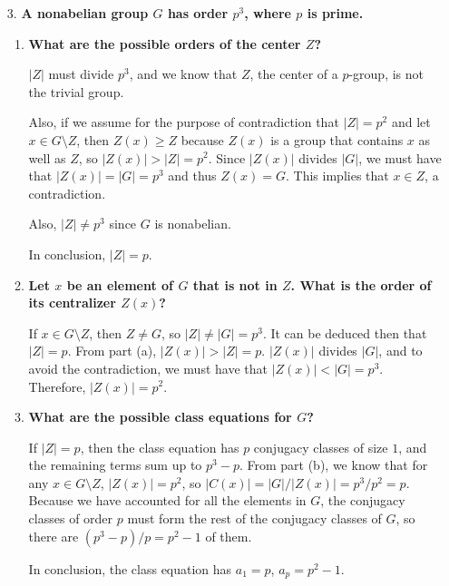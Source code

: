 \documentclass[a4paper,12pt]{article}
\begin{document}
\begin{enumerate}
    \item[3.]
        \boldmath
        \textbf{A nonabelian group $G$ has order $p^3$, where $p$ is prime.} \par
        \unboldmath
        \begin{enumerate}
            \item
                \boldmath
                \textbf{What are the possible orders of the center $Z$?} \par
                \unboldmath
                $|Z|$ must divide $p^3$, and we know that $Z$, the center of a $p$-group, is not the trivial group. \par
                Also, if we assume for the purpose of contradiction that $|Z| = p^2$ and let $x \in G \setminus Z$, then $Z(x) \ge Z$ because $Z(x)$ is a group that contains $x$ as well as $Z$, so $|Z(x)| > |Z| = p^2$. Since $|Z(x)|$ divides $|G|$, we must have that $|Z(x)| = |G| = p^3$ and thus $Z(x) = G$. This implies that $x \in Z$, a contradiction. \par
                Also, $|Z| \neq p^3$ since $G$ is nonabelian. \par
                In conclusion, $|Z| = p$.

            \item
                \boldmath
                \textbf{Let $x$ be an element of $G$ that is not in $Z$. What is the order of its centralizer $Z(x)$?} \par
                \unboldmath
                If $x \in G \setminus Z$, then $Z \neq G$, so $|Z| \neq |G| = p^3$. It can be deduced then that $|Z| = p$. From part (a), $|Z(x)| > |Z| = p$. $|Z(x)|$ divides $|G|$, and to avoid the contradiction, we must have that $|Z(x)| < |G| = p^3$. Therefore, $|Z(x)| = p^2$.

            \item
                \boldmath
                \textbf{What are the possible class equations for $G$?} \par
                \unboldmath
                If $|Z| = p$, then the class equation has $p$ conjugacy classes of size $1$, and the remaining terms sum up to $p^3 - p$. From part (b), we know that for any $x \in G \setminus Z$, $|Z(x)| = p^2$, so $|C(x)| = |G|/|Z(x)| = p^3/p^2 = p$. Because we have accounted for all the elements in $G$, the conjugacy classes of order $p$ must form the rest of the conjugacy classes of $G$, so there are $(p^3 - p)/p = p^2 - 1$ of them. \par
                In conclusion, the class equation has $a_1 = p$, $a_p = p^2 - 1$.
        \end{enumerate}
\end{enumerate}
\end{document}
